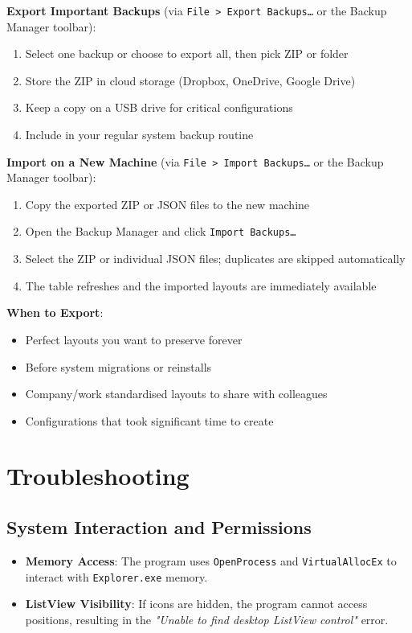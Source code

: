 \documentclass[a4paper,11pt]{article}
\begin{document}
\textbf{Export Important Backups}
(via \texttt{File > Export Backups\ldots} or the Backup Manager toolbar):
\begin{enumerate}
  \item Select one backup or choose to export all, then pick ZIP or folder
  \item Store the ZIP in cloud storage (Dropbox, OneDrive, Google Drive)
  \item Keep a copy on a USB drive for critical configurations
  \item Include in your regular system backup routine
\end{enumerate}

\textbf{Import on a New Machine}
(via \texttt{File > Import Backups\ldots} or the Backup Manager toolbar):
\begin{enumerate}
  \item Copy the exported ZIP or JSON files to the new machine
  \item Open the Backup Manager and click \texttt{Import Backups\ldots}
  \item Select the ZIP or individual JSON files; duplicates are
    skipped automatically
  \item The table refreshes and the imported layouts are immediately available
\end{enumerate}

\textbf{When to Export}:
\begin{itemize}
  \item Perfect layouts you want to preserve forever
  \item Before system migrations or reinstalls
  \item Company/work standardised layouts to share with colleagues
  \item Configurations that took significant time to create
\end{itemize}

\section{Troubleshooting}

\subsection{System Interaction and Permissions}

\begin{warningbox}
  \begin{itemize}
    \item \textbf{Memory Access}: The program uses
      \texttt{OpenProcess} and \texttt{VirtualAllocEx} to interact
      with \texttt{Explorer.exe} memory.
    \item \textbf{ListView Visibility}: If icons are hidden, the
      program cannot access positions, resulting in the
      \textit{"Unable to find desktop ListView control"} error.
  \end{itemize}
\end{warningbox}
\end{document}
